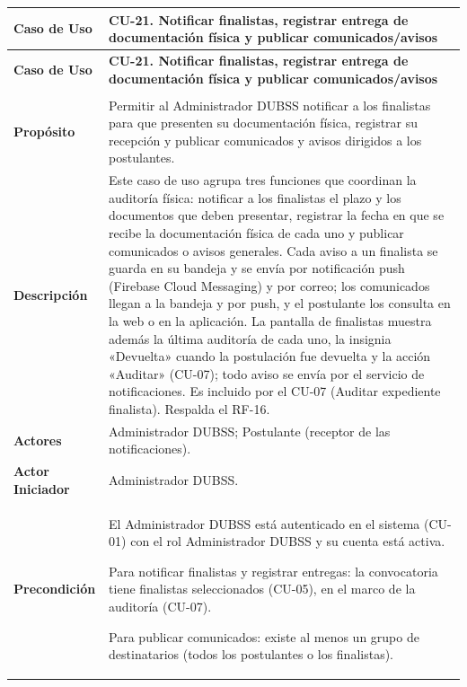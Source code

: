 \begin{longtable}{>{\raggedright\arraybackslash}p{2.9cm} >{\raggedright\arraybackslash}p{12.6cm}}
\toprule
\textbf{Caso de Uso} & \textbf{CU-21. Notificar finalistas, registrar entrega de documentación física y publicar comunicados/avisos} \\
\midrule
\endfirsthead
\toprule
\textbf{Caso de Uso} & \textbf{CU-21. Notificar finalistas, registrar entrega de documentación física y publicar comunicados/avisos} \\
\midrule
\endhead
\endfoot
\bottomrule
\multicolumn{2}{l}{\textit{Nota.} Elaboración propia.} \\
\endlastfoot
\textbf{Propósito} & Permitir al Administrador DUBSS notificar a los finalistas para que presenten su documentación física, registrar su recepción y publicar comunicados y avisos dirigidos a los postulantes. \\
\midrule
\textbf{Descripción} & Este caso de uso agrupa tres funciones que coordinan la auditoría física: notificar a los finalistas el plazo y los documentos que deben presentar, registrar la fecha en que se recibe la documentación física de cada uno y publicar comunicados o avisos generales. Cada aviso a un finalista se guarda en su bandeja y se envía por notificación push (Firebase Cloud Messaging) y por correo; los comunicados llegan a la bandeja y por push, y el postulante los consulta en la web o en la aplicación. La pantalla de finalistas muestra además la última auditoría de cada uno, la insignia «Devuelta» cuando la postulación fue devuelta y la acción «Auditar» (CU-07); todo aviso se envía por el servicio de notificaciones. Es incluido por el CU-07 (Auditar expediente finalista). Respalda el RF-16. \\
\midrule
\textbf{Actores} & Administrador DUBSS; Postulante (receptor de las notificaciones). \\
\midrule
\textbf{Actor Iniciador} & Administrador DUBSS. \\
\midrule
\textbf{Precondición} & \vspace{-\baselineskip}\begin{cuvin}
    \item El Administrador DUBSS está autenticado en el sistema (CU-01) con el rol Administrador DUBSS y su cuenta está activa.
    \item Para notificar finalistas y registrar entregas: la convocatoria tiene finalistas seleccionados (CU-05), en el marco de la auditoría (CU-07).
    \item Para publicar comunicados: existe al menos un grupo de destinatarios (todos los postulantes o los finalistas).

\end{cuvin}
\end{longtable}
